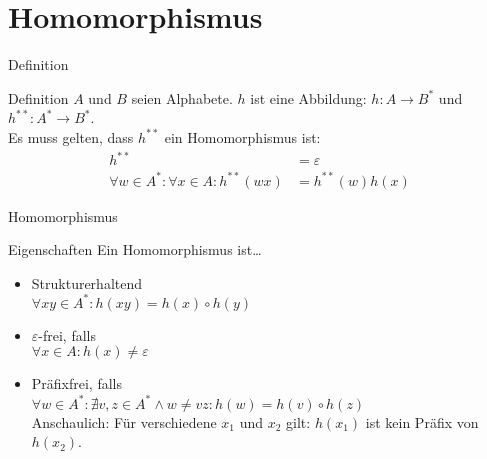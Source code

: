 \section{Homomorphismus}
\begin{frame}{Definition}
    \begin{block}{Definition}
        $A$ und $B$ seien Alphabete. $h$ ist eine Abbildung: $h: A\rightarrow B^*$ und $h^{**}: A^*\rightarrow B^*$. \\ Es muss gelten, dass $h^{**}$ ein Homomorphismus ist:
    \pause
        \begin{align*}
            h^{**} &= \varepsilon\\
            \forall w \in A^*: \forall x \in A: h^{**}\left( wx \right) &= h^{**}\left( w \right)h\left( x \right)
        \end{align*}
    \end{block}
\end{frame}
\begin{frame}{Homomorphismus}
    \begin{block}{Eigenschaften}
        Ein Homomorphismus ist\dots
        \begin{itemize}
            \item Strukturerhaltend\\
                $\forall xy \in A^*: h\left( xy \right) = h\left( x \right)\circ h\left( y \right)$\pause
            \item $\varepsilon$-frei, falls\\
                $\forall x \in A: h\left( x \right) \neq \varepsilon$\pause
            \item Präfixfrei, falls\\
                $\forall w \in A^*: \nexists v,z \in A^* \wedge w \neq vz: h\left( w \right) = h\left( v \right) \circ h\left( z \right)$\\
                Anschaulich: Für verschiedene $x_1$ und $x_2$ gilt: $h\left( x_1 \right)$ ist kein Präfix von $h\left( x_2 \right)$.
        \end{itemize}
    \end{block}
\end{frame}
